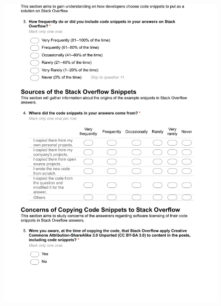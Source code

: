 \documentclass{svjour3}                     %
\begin{document}
\begin{figure}[H]
	\centering
	\includegraphics[width=0.9\linewidth]{answerer-2}
	\label{fig:answerer-2}
\end{figure}
\end{document}
